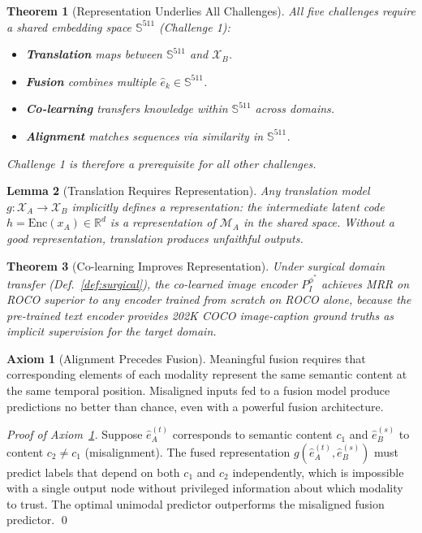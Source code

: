 \documentclass[12pt,a4paper]{article}
\theoremstyle{definition}
\newtheorem{axiom}{Axiom}[section]
\theoremstyle{plain}
\newtheorem{theorem}{Theorem}[section]
\newtheorem{lemma}[theorem]{Lemma}
\theoremstyle{remark}
\newcommand{\R}{\mathbb{R}}
\newcommand{\Sph}{\mathbb{S}}
\newcommand{\MA}{\mathcal{M}_A}
\begin{document}
\begin{theorem}[Representation Underlies All Challenges]
All five challenges require a shared embedding space $\Sph^{511}$ (Challenge 1):
\begin{itemize}[nosep]
  \item \textbf{Translation} maps between $\Sph^{511}$ and $\mathcal{X}_B$.
  \item \textbf{Fusion} combines multiple $\hat{e}_k \in \Sph^{511}$.
  \item \textbf{Co-learning} transfers knowledge within $\Sph^{511}$ across domains.
  \item \textbf{Alignment} matches sequences via similarity in $\Sph^{511}$.
\end{itemize}
Challenge 1 is therefore a prerequisite for all other challenges.
\end{theorem}

\begin{lemma}[Translation Requires Representation]
Any translation model $g : \mathcal{X}_A \to \mathcal{X}_B$ implicitly defines a representation: the intermediate latent code $h = \text{Enc}(x_A) \in \R^d$ is a representation of $\MA$ in the shared space. Without a good representation, translation produces unfaithful outputs.
\end{lemma}

\begin{theorem}[Co-learning Improves Representation]
Under surgical domain transfer (Def.~\ref{def:surgical}), the co-learned image encoder $P_I^{\phi^*}$ achieves MRR on ROCO superior to any encoder trained from scratch on ROCO alone, because the pre-trained text encoder provides 202K COCO image-caption ground truths as implicit supervision for the target domain.
\end{theorem}

\begin{axiom}[Alignment Precedes Fusion]
\label{ax:align_fuse}
Meaningful fusion requires that corresponding elements of each modality represent the same semantic content at the same temporal position. Misaligned inputs fed to a fusion model produce predictions no better than chance, even with a powerful fusion architecture.
\end{axiom}

\begin{proof}[Proof of Axiom~\ref{ax:align_fuse}]
Suppose $\hat{e}_A^{(t)}$ corresponds to semantic content $c_1$ and $\hat{e}_B^{(s)}$ to content $c_2 \ne c_1$ (misalignment). The fused representation $g(\hat{e}_A^{(t)}, \hat{e}_B^{(s)})$ must predict labels that depend on both $c_1$ and $c_2$ independently, which is impossible with a single output node without privileged information about which modality to trust. The optimal unimodal predictor outperforms the misaligned fusion predictor. \qed
\end{proof}
\end{document}
